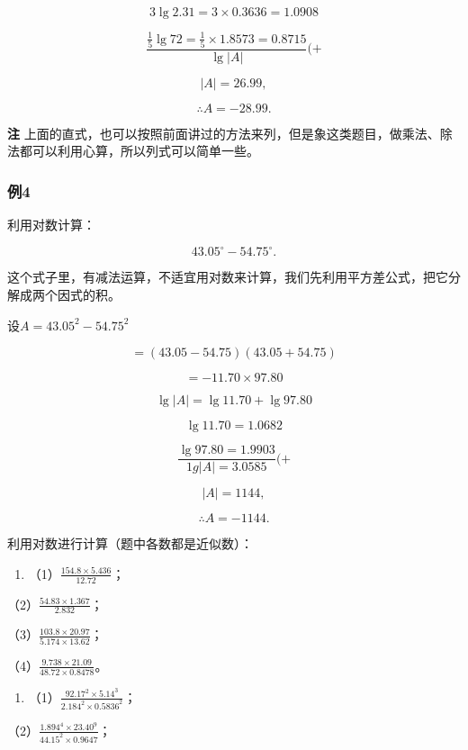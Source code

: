 \[
3 \lg 2.31 = 3 \times 0.3636 = 1.0908
\]

\[
\frac{\frac{1}{5} \lg 72 = \frac{1}{5} \times 1.8573 = 0.8715}{\lg | A |} (+ \tag {+}
\]

\[
\left| A \right| = 26.99,
\]

\[
\therefore A = - 28.99.
\]

\textbf{注}
上面的直式，也可以按照前面讲过的方法来列，但是象这类题目，做乘法、除法都可以利用心算，所以列式可以简单一些。

\subsubsection{例4}

利用对数计算：

\[
43.05^{\circ} - 54.75^{\circ}.
\]

这个式子里，有减法运算，不适宜用对数来计算，我们先利用平方差公式，把它分解成两个因式的积。

 设\(A = 43.05^{2} - 54.75^{2}\)

\[
= (43.05 - 54.75) (43.05 + 54.75)
\]

\[
= - 11.70 \times 97.80
\]

\[
\lg | A | = \lg 11.70 + \lg 97.80
\]

\[
\lg 11.70 = 1.0682
\]

\[
\frac{\lg 97.80 = 1.9903}{1 g | A | = 3.0585} (+
\]

\[
\left| A \right| = 1144,
\]

\[
\therefore A = - 1144.
\]

利用对数进行计算（题中各数都是近似数）：

\begin{enumerate}
\item
  （1）\(\frac{154.8 \times 5.436}{12.72}\)；
\end{enumerate}

（2）\(\frac{54.83 \times 1.367}{2.832}\)；

（3）\(\frac{103.8 \times 20.97}{5.174 \times 13.62}\)；

（4）\(\frac{9.738 \times 21.09}{48.72 \times 0.8478}\)。

\begin{enumerate}[start=2]
\item
  （1）\(\frac{92.17^2 \times 5.14^3}{2.184^2 \times 0.5836^2}\)；
\end{enumerate}

（2）\(\frac{1.894^4 \times 23.40^9}{44.15^2 \times 0.9647}\)；

